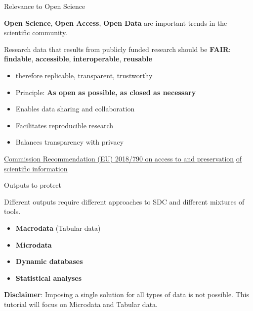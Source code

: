 \documentclass[
	aspectratio = 169
 ]{beamer}
\begin{document}
\begin{frame}{Relevance to Open Science}

\textbf{Open Science}, \textbf{Open Access}, \textbf{Open Data} are
important trends in the scientific community.

Research data that results from publicly funded research should be
\textbf{FAIR}: \newline \textbf{findable}, \textbf{accessible},
\textbf{interoperable}, \textbf{reusable}

\begin{itemize}
\item
  therefore replicable, transparent, trustworthy
\item
  Principle: \textbf{As open as possible, as closed as necessary}
\item
  Enables data sharing and collaboration
\item
  Facilitates reproducible research
\item
  Balances transparency with privacy
\end{itemize}

\href{https://eur-lex.europa.eu/eli/reco/2018/790/oj}{\color{blue}\underline{Commission Recommendation (EU) 2018/790 on access to and preservation}}
\href{https://eur-lex.europa.eu/eli/reco/2018/790/oj}{\color{blue}\underline{of scientific information}}
\end{frame}

\begin{frame}{Outputs to protect}

Different outputs require different approaches to SDC and different
mixtures of tools.

\begin{itemize}
\tightlist
\item
  \textbf{Macrodata} (Tabular data)
\item
  \textbf{Microdata}
\item
  \textbf{Dynamic databases}
\item
  \textbf{Statistical analyses}
\end{itemize}

\vspace{1cm}

\textbf{Disclaimer}: Imposing a single solution for all types of data is
not possible. \newline This tutorial will focus on Microdata and Tabular
data.
\end{frame}
\end{document}
